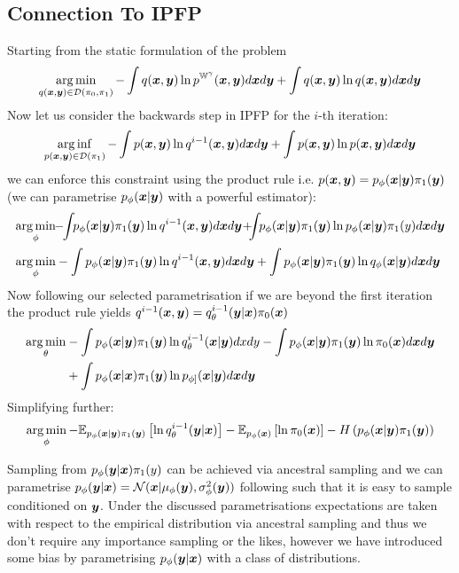 \documentclass[a4paper,12pt,twoside,openright]{report}
\theoremstyle{definition}
\begin{document}
\subsection{Connection To IPFP}
Starting from the static formulation of the problem
\begin{align*}
\operatorname*{arg\,min}_{q({\bm{x}},{\bm{y}}) \in \mathcal{D}(\pi_0, \pi_1)}- \int q({\bm{x}},{\bm{y}}) \operatorname{ln} p^{\mathbb{W}^{\gamma}}({\bm{x}} ,{\bm{y}} )d{\bm{x}} d{\bm{y}} +\int q({\bm{x}},{\bm{y}}) \operatorname{ln} q({\bm{x}} ,{\bm{y}} )d{\bm{x}} d{\bm{y}}
\end{align*}
Now let us consider the backwards step in IPFP for the $i$-th iteration:
\begin{align*}
\operatorname*{arg\,inf}_{p({\bm{x}},{\bm{y}})  \in \mathcal{D}(\pi_1)}- \int p({\bm{x}},{\bm{y}})  \operatorname{ln} q^{i-1}({\bm{x}},{\bm{y}})d{\bm{x}} d{\bm{y}} +\int  p({\bm{x}},{\bm{y}}) \operatorname{ln}  p({\bm{x}},{\bm{y}}) d{\bm{x}} d{\bm{y}}
\end{align*}
we can enforce this constraint using the product rule i.e. $p({\bm{x}},{\bm{y}}) = p_{\phi}({\bm{x}}|{\bm{y}}) \pi_1({\bm{y}})$ (we can parametrise $p_{\phi}({\bm{x}}|{\bm{y}})$ with a powerful estimator):
\begin{align*}
\argmin_{\phi}&\!\!-\!\!\int\!\!p_{\phi}(\vx|\vy) \pi_1(\vy) \log q^{i-1}(\vx,\vy)d\vx d\vy\!+\!\!\!\int\!\!p_{\phi}(\vx|\vy) \pi_1(\vy) \log p_{\phi}(\vx|\vy)
\pi_1(y)d\vx d\vy\\
\argmin_{\phi}&- \int p_{\phi}(\vx|\vy) \pi_1(\vy) \log q^{i-1}(\vx,\vy)d\vx d\vy +\int p_{\phi}(\vx|\vy)\pi_1(\vy) \log q_{\phi}(\vx|\vy)
d\vx d\vy
\end{align*}
Now following our selected parametrisation if we are beyond the first iteration the product rule yields $q^{i-1}({\bm{x}} , {\bm{y}})= q^{i-1}_{\theta}({\bm{y}}|{\bm{x}})\pi_0({\bm{x}})$
\begin{align*}
\operatorname*{arg\,min}_\theta&- \int p_{\phi}({\bm{x}}|{\bm{y}}) \pi_1({\bm{y}}) \operatorname{ln}  q^{i-1}_{\theta}({\bm{x}}|{\bm{y}})dxdy - \int p_{\phi}({\bm{x}}|{\bm{y}}) \pi_1({\bm{y}}) \operatorname{ln}  \pi_0({\bm{x}}) d{\bm{x}} d{\bm{y}} \\
&+\int p_{\phi}({\bm{x}}|{\bm{x}}) \pi_1({\bm{y}}) \operatorname{ln} p_{\phi]}({\bm{x}}|{\bm{y}})d{\bm{x}} d{\bm{y}} 
\end{align*}
Simplifying further:
\begin{align*}
\operatorname*{arg\,min}_\phi- \mathbb{E}_{p_{\phi}({\bm{x}}|{\bm{y}})\pi_1({\bm{y}})}\left[  \operatorname{ln}  q^{i-1}_{\theta}({\bm{y}}|{\bm{x}})\right] -  \mathbb{E}_{p_{\phi}({\bm{x}})}\left[ \operatorname{ln}  \pi_0({\bm{x}}) \right] - H\left(p_{\phi}({\bm{x}}|{\bm{y}})\pi_1({\bm{y}})\right)
\end{align*}

Sampling from $p_{\phi}({\bm{y}}|{\bm{x}})\pi_1(y)$ can be achieved via  ancestral sampling and we can parametrise $p_{\phi}({\bm{y}}|{\bm{x}})={\mathcal{N}}({\bm{x}} | \mu_{\phi}({\bm{y}}), \sigma^2_\phi({\bm{y}}))$ following \cite{kingma2013auto} such that it is easy to sample conditioned on ${\bm{y}}$. Under the discussed parametrisations expectations are taken with respect to the empirical distribution via ancestral sampling and thus we don't require any importance sampling or the likes, however we have introduced some bias by parametrising $p_{\phi}({\bm{y}}|{\bm{x}})$ with a class of distributions.
\end{document}
